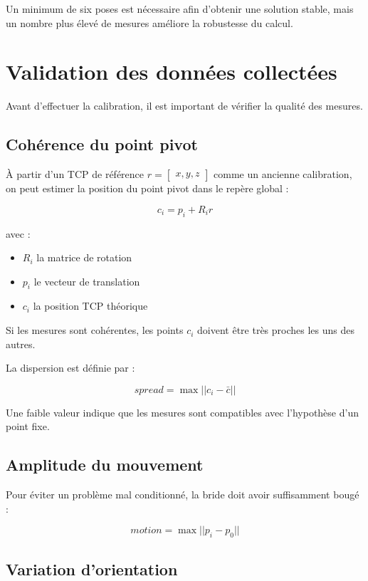 \documentclass[a4paper,11pt]{article}
\begin{document}
Un minimum de six poses est nécessaire afin d’obtenir une solution stable, mais un nombre plus élevé de mesures améliore la robustesse du calcul.

\section{Validation des données collectées}

Avant d'effectuer la calibration, il est important de vérifier la qualité des mesures.

\subsection{Cohérence du point pivot}

À partir d’un TCP de référence $
r=
\begin{bmatrix}
    x,y,z
\end{bmatrix}
$ comme un ancienne calibration, on peut estimer la position du point pivot dans le repère global :

\[
c_i = p_i + R_i r
\]

avec :

\begin{itemize}
\item $R_i$ la matrice de rotation
\item $p_i$ le vecteur de translation
\item $c_i$ la position TCP théorique 
\end{itemize}

Si les mesures sont cohérentes, les points $c_i$ doivent être très proches les uns des autres.

La dispersion est définie par :

\[
spread = \max ||c_i - \bar{c}||
\]

Une faible valeur indique que les mesures sont compatibles avec l’hypothèse d’un point fixe.

\subsection{Amplitude du mouvement}

Pour éviter un problème mal conditionné, la bride doit avoir suffisamment bougé :

\[
motion = \max ||p_i - p_0||
\]

\subsection{Variation d’orientation}
\end{document}
